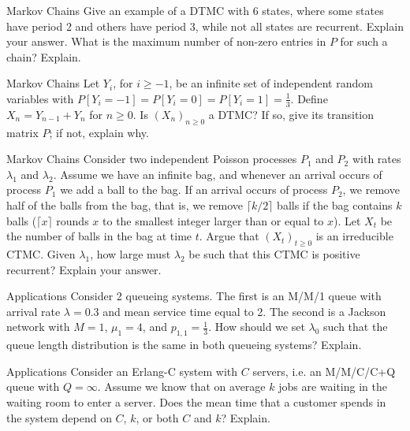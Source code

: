\begin{problem}{Markov Chains}
Give an example of a DTMC with 6 states, where some states have period 2 and others have period 3, while not all states are recurrent. Explain your answer. What is the maximum number of non-zero entries in \( P \) for such a chain? Explain.
\end{problem}

\begin{problem}{Markov Chains}
Let \( Y_i \), for \( i \geq -1 \), be an infinite set of independent random variables with \( P [Y_i = -1] = P [Y_i = 0] = P [Y_i = 1] = \frac{1}{3} \). Define \( X_n = Y_{n-1} + Y_n \) for \( n \geq 0 \). Is \( (X_n)_{n \geq 0} \) a DTMC? If so, give its transition matrix \( P \); if not, explain why.
\end{problem}

\begin{problem}{Markov Chains}
Consider two independent Poisson processes \( P_1 \) and \( P_2 \) with rates \( \lambda_1 \) and \( \lambda_2 \). Assume we have an infinite bag, and whenever an arrival occurs of process \( P_1 \) we add a ball to the bag. If an arrival occurs of process \( P_2 \), we remove half of the balls from the bag, that is, we remove \( \lceil k/2 \rceil \) balls if the bag contains \( k \) balls (\( \lceil x \rceil \) rounds \( x \) to the smallest integer larger than or equal to \( x \)). Let \( X_t \) be the number of balls in the bag at time \( t \). Argue that \( (X_t)_{t \geq 0} \) is an irreducible CTMC. Given \( \lambda_1 \), how large must \( \lambda_2 \) be such that this CTMC is positive recurrent? Explain your answer.
\end{problem}

\begin{problem}{Applications}
Consider 2 queueing systems. The first is an M/M/1 queue with arrival rate \( \lambda = 0.3 \) and mean service time equal to 2. The second is a Jackson network with \( M = 1 \), \( \mu_1 = 4 \), and \( p_{1,1} = \frac{1}{3} \). How should we set \( \lambda_0 \) such that the queue length distribution is the same in both queueing systems? Explain.
\end{problem}

\begin{problem}{Applications}
Consider an Erlang-C system with \( C \) servers, i.e. an M/M/C/C+Q queue with \( Q = \infty \). Assume we know that on average \( k \) jobs are waiting in the waiting room to enter a server. Does the mean time that a customer spends in the system depend on \( C \), \( k \), or both \( C \) and \( k \)? Explain.
\end{problem}
